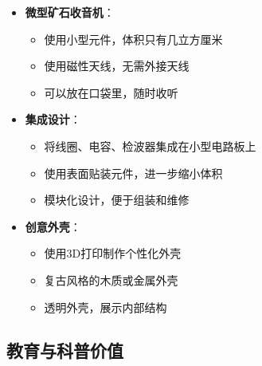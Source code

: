 \documentclass[12pt,UTF8]{ctexbook}
\begin{document}
\begin{itemize}[leftmargin=3.5em]
    \item \textbf{微型矿石收音机}：
        \begin{itemize}[leftmargin=3.5em]
            \item 使用小型元件，体积只有几立方厘米
            \item 使用磁性天线，无需外接天线
            \item 可以放在口袋里，随时收听
        \end{itemize}
    \item \textbf{集成设计}：
        \begin{itemize}[leftmargin=3.5em]
            \item 将线圈、电容、检波器集成在小型电路板上
            \item 使用表面贴装元件，进一步缩小体积
            \item 模块化设计，便于组装和维修
        \end{itemize}
    \item \textbf{创意外壳}：
        \begin{itemize}[leftmargin=3.5em]
            \item 使用3D打印制作个性化外壳
            \item 复古风格的木质或金属外壳
            \item 透明外壳，展示内部结构
        \end{itemize}
\end{itemize}

\subsection{教育与科普价值}
\end{document}
